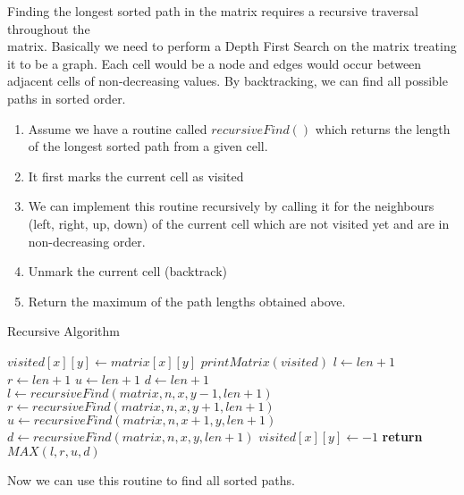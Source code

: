 \documentclass[letterpaper, 11 pt, conference]{ieeeconf}  %
\begin{document}
Finding the longest sorted path in the matrix requires a recursive traversal throughout the 
\\matrix. Basically we need to perform a Depth First Search on the matrix treating it to be a graph. Each cell would be a node and edges would occur between adjacent cells of non-decreasing values. By backtracking, we can find all possible paths in sorted order.

\begin{enumerate}
\item Assume we have a routine called $recursiveFind()$ which returns the length of the longest sorted path from a given cell. 
\item It first marks the current cell as visited
\item We can implement this routine recursively by calling it for the neighbours (left, right, up, down) of the current cell which are not visited yet and are in non-decreasing order. 
\item Unmark the current cell (backtrack)
\item Return the maximum of the path lengths obtained above. 
\end{enumerate}

\begin{algorithm}
\caption{Recursive Algorithm}
\begin{algorithmic}
	\small
      \State $visited[x][y]\gets matrix[x][y]$
      	\State $printMatrix(visited)$
      \EndIf
      \State $l\gets len+1$
      \State $r\gets len+1$
      \State $u\gets len+1$
      \State $d\gets len+1$
      \If {$visited[x][y-1]==-1~AND~matrix[x][y-1]\geq matrix[x][y]]$}
      	\State $l\gets recursiveFind(matrix, n, x, y-1, len+1)$
      \EndIf
      \If {$visited[x][y+1]==-1~AND~matrix[x][y+1]\geq matrix[x][y]]$}
      	\State $r\gets recursiveFind(matrix, n, x, y+1, len+1)$
      \EndIf
      \If {$visited[x-1][y]==-1~AND~matrix[x-1][y]\geq matrix[x][y]]$}
      	\State $u\gets recursiveFind(matrix, n, x+1, y, len+1)$
      \EndIf
      \If {$visited[x+1][y]==-1~AND~matrix[x+1][y]\geq matrix[x][y]]$}
      	\State $d\gets recursiveFind(matrix, n, x, y, len+1)$
      \EndIf
      \State $visited[x][y]\gets -1$
      \State \textbf{return} $MAX(l,r,u,d)$
    \EndProcedure
  \end{algorithmic}
\end{algorithm}


Now we can use this routine to find all sorted paths.
\end{document}
